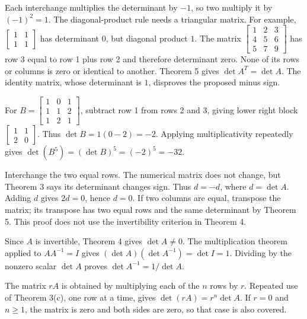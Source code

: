  Each interchange multiplies the determinant by $-1$, so two multiply it by $(-1)^2=1$.
 The diagonal-product rule needs a triangular matrix. For example, $\left[\begin{smallmatrix}1&1\\1&1\end{smallmatrix}\right]$ has determinant $0$, but diagonal product $1$.
 The matrix $\left[\begin{smallmatrix}1&2&3\\4&5&6\\5&7&9\end{smallmatrix}\right]$ has row 3 equal to row 1 plus row 2 and therefore determinant zero. None of its rows or columns is zero or identical to another.
 Theorem 5 gives $\det A^T=\det A$. The identity matrix, whose determinant is $1$, disproves the proposed minus sign.

For $B=\left[\begin{smallmatrix}1&0&1\\1&1&2\\1&2&1\end{smallmatrix}\right]$, subtract row 1 from rows 2 and 3, giving lower right block $\left[\begin{smallmatrix}1&1\\2&0\end{smallmatrix}\right]$. Thus $\det B=1(0-2)=-2$. Applying multiplicativity repeatedly gives $\det(B^5)=(\det B)^5=(-2)^5=-32$.

Interchange the two equal rows. The numerical matrix does not change, but Theorem 3 says its determinant changes sign. Thus $d=-d$, where $d=\det A$. Adding $d$ gives $2d=0$, hence $d=0$. If two columns are equal, transpose the matrix; its transpose has two equal rows and the same determinant by Theorem 5. This proof does not use the invertibility criterion in Theorem 4.

Since $A$ is invertible, Theorem 4 gives $\det A\ne0$. The multiplication theorem applied to $AA^{-1}=I$ gives $(\det A)(\det A^{-1})=\det I=1$. Dividing by the nonzero scalar $\det A$ proves $\det A^{-1}=1/\det A$.

The matrix $rA$ is obtained by multiplying each of the $n$ rows by $r$. Repeated use of Theorem 3(c), one row at a time, gives $\det(rA)=r^n\det A$. If $r=0$ and $n\ge1$, the matrix is zero and both sides are zero, so that case is also covered.

